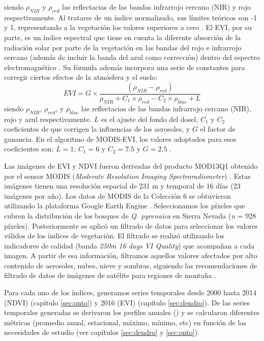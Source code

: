 siendo \(\rho_{NIR}\) y \(\rho_{red}\) las reflectacias de las bandas infrarrojo cercano (NIR) y rojo respectivamente. Al tratarse de un índice normalizado, sus límites teóricos son -1 y 1, representando a la
vegetación los valores superiores a cero \autocites{Hueteetal2002OverviewRadiometric}. El EVI, por su parte, es un índice espectral que tiene en cuenta la diferente absorción de la radiación solar por parte de la vegetación en las bandas del rojo e infrarrojo cercano (además de incluir la banda del azul como corrección)
dentro del espectro electromagnético \autocites{Hueteetal2002OverviewRadiometric}. Su fórmula además incorpora una serie de constantes para corregir ciertos efectos de la atmósfera y el suelo:
\[EVI = G\times\frac{(\rho_{NIR}-\rho_{red})}{\rho_{NIR} + C_{1} \times \rho_{red} - C_{2}\times \rho_{blue} + L}\]
siendo \(\rho_{NIR}\), \(\rho_{red}\), y \(\rho_{blue}\) las reflectacias de las bandas infrarrojo cercano (NIR), rojo y azul respectivamente. \(L\) es el ajuste del fondo del dosel, \(C_{1}\) y \(C_{2}\) coeficientes de que corrigen la influencias de los aerosoles, y \(G\) el factor de ganancia. En el algoritmo de MODIS-EVI, los valores adoptados para esos coeficientes son: \(L = 1\); \(C_{1} = 6\) y \(C_{2}=7.5\) y \(G = 2.5\) \autocites{Hueteetal2002OverviewRadiometric}.

Las imágenes de EVI y NDVI fueron derivadas del producto MOD13Q1 obtenido por el sensor MODIS (\emph{Moderate Resolution Imaging Spectroradiometer}) \autocites{Didan2015MOD13Q1MODIS}. Estas imágenes tienen una resolución espacial de 231 m y temporal de 16 días (23 imágenes por año). Los datos de MODIS de la Colección 6 se obtuvieron utilizando la plataforma Google Earth Engine \autocites{Gorelicketal2017GoogleEarth}. Seleccionamos los píxeles que cubren la distribución de los bosques de \emph{Q. pyrenaica} en Sierra Nevada (\emph{n} = 928 píxeles). Posteriormente se aplicó un filtrado de datos para seleccionar los valores válidos de los índices de vegetación. El filtrado se realizó utilizando los indicadores de calidad (banda \emph{250m 16 days VI Quality}) que acompañan a cada imagen. A partir de esa información, filtramos aquellos valores afectados por alto contenido de aerosoles, nubes, nieve y sombras, siguiendo las recomendaciones de filtrado de datos de imágenes de satélite para regiones de montaña \autocites{Reyes2015}.

Para cada uno de los índices, generamos series temporales desde 2000 hasta 2014 (NDVI) (capítulo \ref{sec:onto}) y 2016 (EVI) (capítulo \ref{sec:dendro}). De las series temporales generadas se derivaron los perfiles anuales () y se calcularon diferentes métricas (promedio anual, estacional, máximo, mínimo, etc) en función de las necesidades de estudio (ver capítulos \ref{sec:dendro} y \ref{sec:onto}). 

